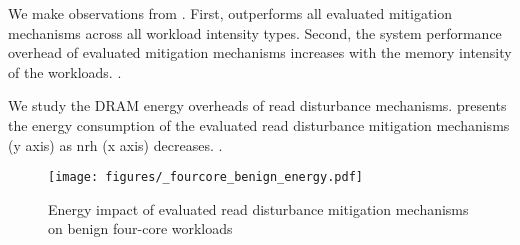 We make  observations from .
First, \X{} outperforms all evaluated mitigation mechanisms across all workload intensity types.
Second, the system performance overhead of evaluated mitigation mechanisms increases with the memory intensity of the workloads.
.

We study the DRAM energy overheads of read disturbance mechanisms.
 presents the energy consumption of the evaluated read disturbance mitigation mechanisms (y axis)  as \gls{nrh} (x axis) decreases.
.

\begin{figure}[h]
\centering
\texttt{[image: figures/\_fourcore\_benign\_energy.pdf]}
\caption{Energy impact of evaluated read disturbance mitigation mechanisms on  benign four-core workloads}
\label{fig:benign_energy}
\end{figure}

